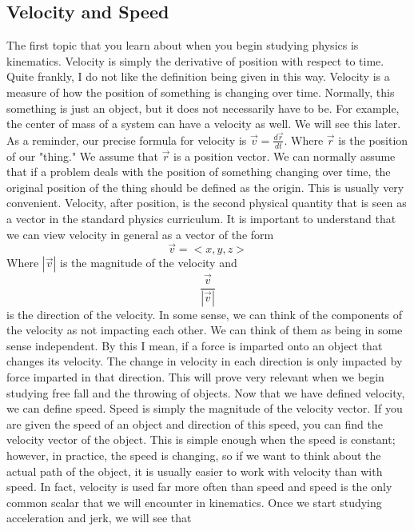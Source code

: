 \documentclass{article}[gray]
\numberwithin{equation}{subsection}
\begin{document}
\subsection{Velocity and Speed}
\vspace{5mm}
\newline
The first topic that you learn about when you begin studying physics is kinematics. Velocity is simply the derivative of position with respect to time. Quite frankly, I do not like the definition being given in this way. Velocity is a measure of how the position of something is changing over time. Normally, this something is just an object, but it does not necessarily have to be. For example, the center of mass of a system can have a velocity as well. We will see this later. As a reminder, our precise formula for velocity is $ \vec{v}= \frac{d\vec{r}}{dt}$. Where $\vec{r}$ is the position of our "thing." We assume that $\vec{r}$ is a position vector. We can normally assume that if a problem deals with the position of something changing over time, the original position of the thing should be defined as the origin. This is usually very convenient. Velocity, after position, is the second physical quantity that is seen as a vector in the standard physics curriculum. It is important to understand that we can view velocity in general as a vector of the form \begin{equation} \vec{v}= <x,y,z>\end{equation} Where $|\vec{v}|$ is the magnitude of the velocity and \begin{equation}\frac{\vec{v}}{|\vec{v}|}\end{equation} is the direction of the velocity. In some sense, we can think of the components of the velocity as not impacting each other. We can think of them as being in some sense independent. By this I mean, if a force is imparted onto an object that changes its velocity. The change in velocity in each direction is only impacted by force imparted in that direction. This will prove very relevant when we begin studying free fall and the throwing of objects. Now that we have defined velocity, we can define speed. Speed is simply the magnitude of the velocity vector. If you are given the speed of an object and direction of this speed, you can find the velocity vector of the object. This is simple enough when the speed is constant; however, in practice, the speed is changing, so if we want to think about the actual path of the object, it is usually easier to work with velocity than with speed. In fact, velocity is used far more often than speed and speed is the only common scalar that we will encounter in kinematics. Once we start studying acceleration and jerk, we will see that 
\end{document}
